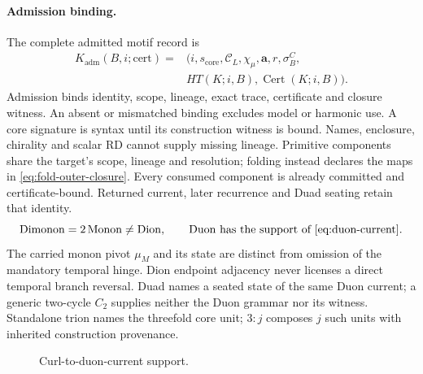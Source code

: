 \paragraph{Admission binding.}
The complete admitted motif record is
\begin{equation}
\begin{split}
K_{\mathrm{adm}}(B,i;\mathrm{cert})={}&
(i,s_{\mathrm{core}},\mathcal C_L,\chi_\mu,\mathbf a,r,\sigma^C_B,\\
&HT(K;i,B),\operatorname{Cert}(K;i,B)).
\end{split}
\label{eq:motif-admission}
\end{equation}
Admission binds identity, scope, lineage, exact trace, certificate and closure
witness. An absent or mismatched binding excludes model or harmonic use. A core signature is syntax until its construction witness is bound.
Names, enclosure, chirality and scalar RD cannot supply missing lineage. Primitive components share the target's scope, lineage and
resolution; folding instead declares the maps in \eqref{eq:fold-outer-closure}.
Every consumed component is already committed and certificate-bound. Returned
current, later recurrence and Duad seating retain that identity.
\begin{equation}
\mathrm{Dimonon}=2\,\mathrm{Monon}\ne\mathrm{Dion},\qquad
\mathrm{Duon}\ \text{has the support of }\eqref{eq:duon-current}.
\label{eq:motif-grammar}
\end{equation}
The carried monon pivot \(\mu_M\) and its state are distinct from omission of
the mandatory temporal hinge. Dion endpoint adjacency never licenses a direct
temporal branch reversal. Duad names a seated state of the same Duon current;
a generic two-cycle \(C_2\) supplies neither the Duon grammar nor its witness.
Standalone trion names the threefold core unit; \(3:j\) composes \(j\) such
units with inherited construction provenance.

\begin{figure}[H]
\centering
\setlength{\fboxsep}{8pt}
\caption{Curl-to-duon-current support.}
\label{fig:curl-to-duon-current-support}
\end{figure}

